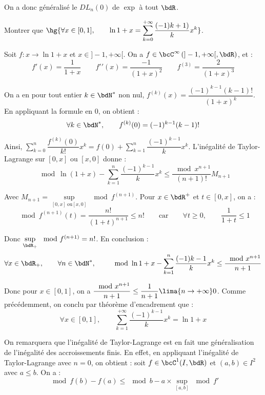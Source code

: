 \documentclass[a4paper,french,bookmarks]{article}
\begin{document}
    On a donc généralisé le $DL_n(0)$ de $\exp$ à tout $\bdR$.
    
    \begin{example}{}{}
        Montrer que $\hg{\forall x \in [0, 1],\qquad \ln{1+x} = \displaystyle \sum_{k=0}^{+\infty} \dfrac{(-1){k+1)}}{k}x^k}$.
        
        \tcblower
        
        Soit $f : x \to \ln{1+x}$ et $x \in ]-1, +\infty[$. On a $f \in \bcC^{\infty}\left(]-1, +\infty[, \bdR\right)$, et :
        \[ f\prime(x) = \dfrac{1}{1+x} \qquad f\prime\prime(x) = \dfrac{-1}{(1+x)^2}\qquad f^{(3)} = \dfrac{2}{(1+x)^3}\]
        
        On a en pour tout entier $k \in \bdN^*$ non nul, $f^{(k)}(x) = \dfrac{(-1)^{k-1}(k-1)!}{(1+x)^k}$. En appliquant la formule en $0$, on obtient :
        \[ \forall k \in \bdN^*,\qquad f^{(k)}(0) = (-1)^{k-1}(k-1)!\]
        
        Ainsi, $\displaystyle \sum_{k=0}^n \dfrac{f^{(k)}(0)}{k!}x^k = f(0) + \displaystyle \sum_{k=1}^n \dfrac{(-1)^{k-1}}{k}x^k$. L'inégalité de Taylor-Lagrange sur $[0, x]$ ou $[x, 0]$ donne :
        \[ \mod{\ln(1+x) - \sum_{k=1}^n \dfrac{(-1)^{k-1}}{k}x^k} \leq \dfrac{\mod{x}^{n+1}}{(n+1)!}M_{n+1}\]
        
        Avec $M_{n+1} = \sup\limits_{[0, x] \ \text{ou} [x, 0]} \mod{f^{(n+1)}}$. Pour $x \in \bdR^+$ et $t \in [0, x]$, on a :
        \[ \mod{f^{(n+1)}(t)} = \dfrac{n!}{(1+t)^{n+1}} \leq n! \qquad\text{car}\qquad \forall t \geq 0,\qquad \dfrac{1}{1+t} \leq 1\]
        
        Donc $\sup\limits_{\bdR_+} \mod{f^{(n+1)}} = n!$. En conclusion :
        \[ \forall x \in \bdR_+,\qquad \forall n \in \bdN^*,\qquad \mod{\ln{1+x} - \sum_{k=1}^n \dfrac{(-1){k-1}}{k}x^k} \leq \dfrac{\mod{x}^{n+1}}{n+1}\]
        
        Donc pour $x \in [0, 1]$, on a $\dfrac{\mod{x}^{n+1}}{n+1} \leq \dfrac{1}{n+1} \lima{n \to +\infty} 0$. Comme précédemment, on conclu par théorème d'encadrement que :
        \[ \forall x \in [0, 1],\qquad \sum_{k=1}^{+\infty} \dfrac{(-1)^{k-1}}{k}x^k = \ln{1+x}\]
    \end{example}
    
On remarquera que l'inégalité de Taylor-Lagrange est en fait une généralisation de l'inégalité des accroissements finis. En effet, en appliquant l'inégalité de Taylor-Lagrange avec $n = 0$, on obtient : soit $f \in \bcC^1(I, \bdR)$ et $(a, b) \in I^2$ avec $a \leq b$. On a :
%
\[ \mod{f(b) - f(a)} \leq \mod{b-a} \times \sup\limits_{[a, b]} \mod{f'}\]
    
\end{document}
